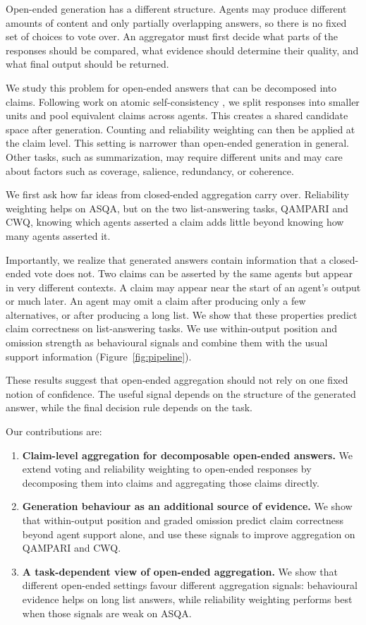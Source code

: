 \documentclass{article}
\begin{document}
Open-ended generation has a different structure. Agents may produce different amounts of content and only partially overlapping answers, so there is no fixed set of choices to vote over. An aggregator must first decide what parts of the responses should be compared, what evidence should determine their quality, and what final output should be returned.

We study this problem for open-ended answers that can be decomposed into claims. Following work on atomic self-consistency \cite{thirukovalluru2024atomic}, we split responses into smaller units and pool equivalent claims across agents. This creates a shared candidate space after generation. Counting and reliability weighting can then be applied at the claim level. This setting is narrower than open-ended generation in general. Other tasks, such as summarization, may require different units and may care about factors such as coverage, salience, redundancy, or coherence.

We first ask how far ideas from closed-ended aggregation carry over. Reliability weighting helps on ASQA, but on the two list-answering tasks, QAMPARI and CWQ, knowing which agents asserted a claim adds little beyond knowing how many agents asserted it.

Importantly, we realize that generated answers contain information that a closed-ended vote does not. Two claims can be asserted by the same agents but appear in very different contexts. A claim may appear near the start of an agent's output or much later. An agent may omit a claim after producing only a few alternatives, or after producing a long list. We show that these properties predict claim correctness on list-answering tasks. We use within-output position and omission strength as behavioural signals and combine them with the usual support information (Figure~\ref{fig:pipeline}).

These results suggest that open-ended aggregation should not rely on one fixed notion of confidence. The useful signal depends on the structure of the generated answer, while the final decision rule depends on the task.

Our contributions are:

\begin{enumerate}
\item \textbf{Claim-level aggregation for decomposable open-ended answers.}
We extend voting and reliability weighting to open-ended responses by decomposing them into claims and aggregating those claims directly.
\item \textbf{Generation behaviour as an additional source of evidence.}
We show that within-output position and graded omission predict claim correctness beyond agent support alone, and use these signals to improve aggregation on QAMPARI and CWQ.
\item \textbf{A task-dependent view of open-ended aggregation.}
We show that different open-ended settings favour different aggregation signals: behavioural evidence helps on long list answers, while reliability weighting performs best when those signals are weak on ASQA.

\end{enumerate}
\end{document}
